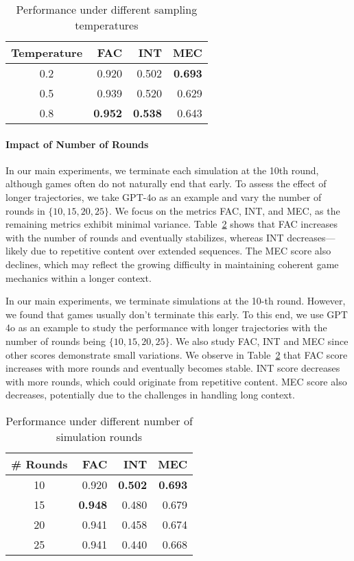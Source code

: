 \begin{table}[!ht]
    \centering
    \begin{tabular}{crrr}
    \toprule
    Temperature   &  FAC & INT & MEC \\
    \midrule
    0.2   &  0.920 & 0.502 & \textbf{0.693}\\
    0.5   &  0.939 & 0.520 & 0.629\\
    0.8   &  \textbf{0.952} & \textbf{0.538} & 0.643\\
    \bottomrule
    \end{tabular}
    \caption{Performance under different sampling temperatures}
    \label{tab:gs_temp}
\end{table}
\paragraph{Impact of Number of Rounds} In our main experiments, we terminate each simulation at the 10th round, although games often do not naturally end that early. To assess the effect of longer trajectories, we take GPT-4o as an example and vary the number of rounds in $\{10, 15, 20, 25\}$. We focus on the metrics FAC, INT, and MEC, as the remaining metrics exhibit minimal variance. Table~\ref{tab:gs_round} shows that FAC increases with the number of rounds and eventually stabilizes, whereas INT decreases—likely due to repetitive content over extended sequences. The MEC score also declines, which may reflect the growing difficulty in maintaining coherent game mechanics within a longer context.

In our main experiments, we terminate simulations at the 10-th round. However, we found that games usually don't terminate this early. To this end, we use GPT 4o as an example to study the performance with longer trajectories with the number of rounds being $\{10, 15, 20, 25\}$. We also study FAC, INT and MEC since other scores demonstrate small variations. We observe in Table~\ref{tab:gs_round} that FAC score increases with more rounds and eventually becomes stable. INT score decreases with more rounds, which could originate from repetitive content. MEC score also decreases, potentially due to the challenges in handling long context.

\begin{table}[!ht]
    \centering
    \begin{tabular}{crrr}
    \toprule
    \# Rounds   &  FAC & INT & MEC \\
    \midrule
    10   &  0.920 & \textbf{0.502} & \textbf{0.693}\\
    15   &  \textbf{0.948} & 0.480 & 0.679\\
    20   &  0.941 & 0.458 & 0.674\\
    25   &  0.941 & 0.440 & 0.668\\
    \bottomrule
    \end{tabular}
    \caption{Performance under different number of simulation rounds}
    \label{tab:gs_round}
\end{table}

